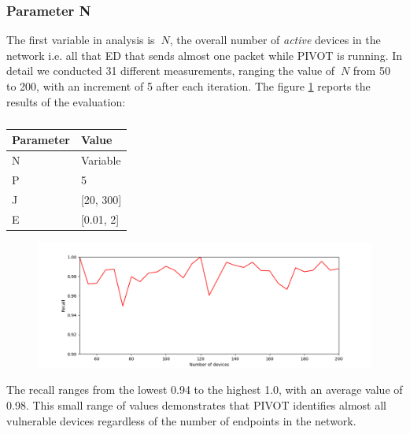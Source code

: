 \vspace{3mm}

\subsubsection{Parameter N}
The first variable in analysis is \(\ N \), the overall number of \textit{active} devices in the network i.e. all that ED that sends almost one packet while PIVOT is running. In detail we conducted 31 different measurements, ranging the value of \(\ N \) from 50 to 200, with an increment of 5 after each iteration. The figure \ref{fig:testn} reports the results of the evaluation:

\vspace{3mm}
\begin{table}[H]
\centering
\caption{}
\label{tab:parameter_N}
\begin{tabular}{|l|l|}
\hline
\multicolumn{1}{|c|}{\textbf{Parameter}} & \textbf{Value} \\ \hline
N                                        & Variable            \\ \hline
P                                        & 5              \\ \hline
J                                     & [20, 300]             \\ \hline
E                                     & [0.01, 2]           \\ \hline
\end{tabular}
\end{table}
\vspace{3mm}

\vspace{3mm}
\begin{figure}[H]
    \centering
    \includegraphics[width=1\linewidth]{images/implementation/N.png}
    \caption{}
    \label{fig:testn}
\end{figure}
\vspace{3mm}

The recall ranges from the lowest 0.94 to the highest 1.0, with an average value of 0.98. This small range of values demonstrates that PIVOT identifies almost all vulnerable devices regardless of the number of endpoints in the network.

